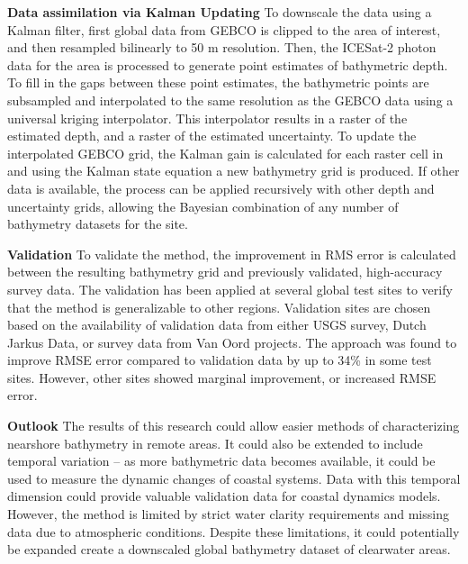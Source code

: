 \noindent\textbf{Data assimilation via Kalman Updating} To downscale the data using a Kalman filter, first global data from GEBCO is clipped to the area of interest, and then resampled bilinearly to 50 m resolution. Then, the ICESat-2 photon data for the area is processed to generate point estimates of bathymetric depth. To fill in the gaps between these point estimates, the bathymetric points are subsampled and interpolated to the same resolution as the GEBCO data using a universal kriging interpolator. This interpolator results in a raster of the estimated depth, and a raster of the estimated uncertainty. To update the interpolated GEBCO grid, the Kalman gain is calculated for each raster cell in and using the Kalman state equation a new bathymetry grid is produced. If other data is available, the process can be applied recursively with other depth and uncertainty grids, allowing the Bayesian combination of any number of bathymetry datasets for the site.


\noindent \textbf{Validation} To validate the method, the improvement in RMS error is calculated between the resulting bathymetry grid and previously validated, high-accuracy survey data. The validation has been applied at several global test sites to verify that the method is generalizable to other regions. Validation sites are chosen based on the availability of validation data from either USGS survey, Dutch Jarkus Data, or survey data from Van Oord projects. The approach was found to improve RMSE error compared to validation data by up to 34\% in some test sites. However, other sites showed marginal improvement, or increased RMSE error.   


\noindent\textbf{Outlook} The results of this research could allow easier methods of characterizing nearshore bathymetry in remote areas. It could also be extended to include temporal variation – as more bathymetric data becomes available, it could be used to measure the dynamic changes of coastal systems. Data with this temporal dimension could provide valuable validation data for coastal dynamics models. However, the method is limited by strict water clarity requirements and missing data due to atmospheric conditions. Despite these limitations, it could potentially be expanded create a downscaled global bathymetry dataset of clearwater areas.